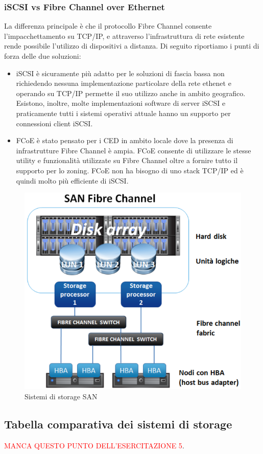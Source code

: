 \documentclass{article}
\begin{document}
\subsubsection{iSCSI vs Fibre Channel over Ethernet}
La differenza principale è che il protocollo Fibre Channel consente l'impacchettamento su TCP/IP, e attraverso l'infrastruttura di rete esistente rende possibile l'utilizzo di dispositivi a distanza.
Di seguito riportiamo i punti di forza delle due soluzioni:
\begin{itemize}
    \item iSCSI è sicuramente più adatto per le soluzioni di fascia bassa non richiedendo nessuna implementazione particolare della rete ethenet e operando su TCP/IP permette il suo utilizzo anche in ambito geografico. Esistono, inoltre, molte implementazioni software di server iSCSI e praticamente tutti i sistemi operativi attuale hanno un supporto per connessioni client iSCSI.
    \item FCoE è stato pensato per i CED in ambito locale dove la presenza di infrastrutture Fibre Channel è ampia. FCoE consente di utilizzare le stesse utility e funzionalità utilizzate su Fibre Channel oltre a fornire tutto il supporto per lo zoning. FCoE non ha bisogno di uno stack TCP/IP ed è quindi molto più efficiente di iSCSI.
\end{itemize}
\begin{figure}[H]
    \center
    \includegraphics[scale=0.4]{images/fig1.png}
    \caption{Sistemi di storage SAN}\label{fig:1}
\end{figure}
\subsection{Tabella comparativa dei sistemi di storage}
\textcolor{red}{MANCA QUESTO PUNTO DELL'ESERCITAZIONE 5}.
\end{document}
